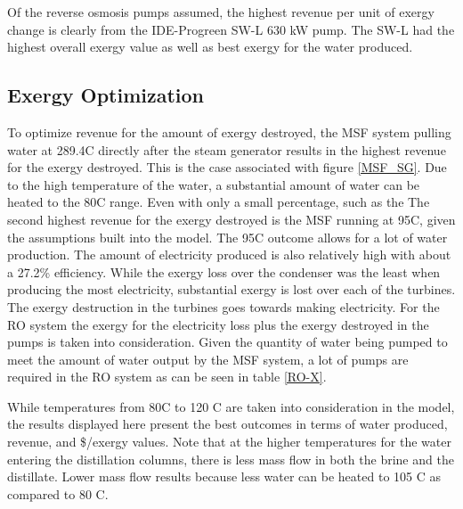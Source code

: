 Of the reverse osmosis pumps assumed, the highest revenue per unit of exergy change is clearly from the IDE-Progreen SW-L 630 kW pump.  The SW-L had the highest overall exergy value as well as best exergy for the water produced. 


\subsection{Exergy Optimization}
To optimize revenue for the amount of exergy destroyed, the MSF system pulling water at 289.4\degree C directly after the steam generator results in the highest revenue for the exergy destroyed. This is the case associated with figure \ref{MSF_SG}.  Due to the high temperature of the water, a substantial amount of water can be heated to the 80\degree C range.  Even with only a small percentage, such as the  The second highest revenue for the exergy destroyed is the MSF running at 95\degree C, given the assumptions built into the model.  The 95\degree C outcome allows for a lot of water production. The amount of electricity produced is also relatively high with about a 27.2\% efficiency. While the exergy loss over the condenser was the least when producing the most electricity, substantial exergy is lost over each of the turbines.  The exergy destruction in the turbines goes towards making electricity. For the RO system the exergy for the electricity loss plus the exergy destroyed in the pumps is taken into consideration.  Given the quantity of water being pumped to meet the amount of water output by the MSF system, a lot of pumps are required in the RO system as can be seen in table \ref{RO-X}.
% 
% 
% 


While temperatures from 80\degree C to 120 \degree C are taken into consideration in the model, the results displayed here present the best outcomes in terms of water produced, revenue, and \$/exergy values. Note that at the higher temperatures for the water entering the distillation columns, there is less mass flow in both the brine and the distillate.  Lower mass flow results because less water can be heated to 105 \degree C as compared to 80 \degree C. 

